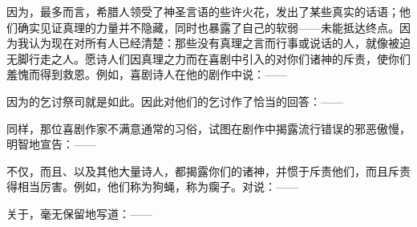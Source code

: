 \par

因为，最多而言，希腊人领受了神圣言语的些许火花，发出了某些真实的话语；他们确实见证真理的力量并不隐藏，同时也暴露了自己的软弱——未能抵达终点。因为我认为现在对所有人已经清楚：那些没有真理之言而行事或说话的人，就像被迫无脚行走之人。愿诗人们因真理之力而在喜剧中引入的对你们诸神的斥责，使你们羞愧而得到救恩。例如，喜剧诗人在他的剧作中说：——\par

\par

因为的乞讨祭司就是如此。因此对他们的乞讨作了恰当的回答：——\par

\par

同样，那位喜剧作家不满意通常的习俗，试图在剧作中揭露流行错误的邪恶傲慢，明智地宣告：——\par

\par

不仅，而且、以及其他大量诗人，都揭露你们的诸神，并惯于斥责他们，而且斥责得相当厉害。例如，他们称为狗蝇，称为瘸子。对说：——\par

\par

关于，毫无保留地写道：——\par

\par

